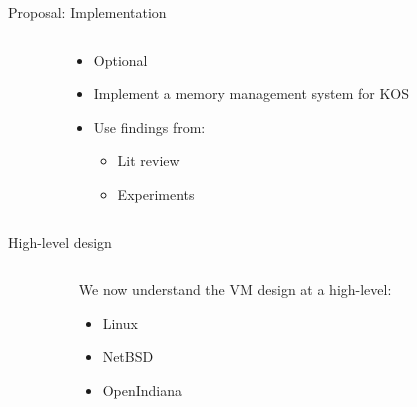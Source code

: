 \documentclass[aspectratio=169]{beamer}
\newcommand{\bi}{\begin{itemize}}
\newcommand{\ei}{\end{itemize}}
\begin{document}
\begin{frame}{Proposal: Implementation}
  \begin{columns}[T]
    \begin{column}{0.2\textwidth}
    \end{column}
    \begin{column}{0.6\textwidth}
      \bi
      \pause
    \item Optional
      \pause
    \item Implement a memory management system for KOS
      \pause
    \item Use findings from:
      \bi
      \pause
    \item Lit review
      \pause
    \item Experiments
      \ei
      \ei
    \end{column}
    \begin{column}{0.2\textwidth}
    \end{column}
  \end{columns}
\end{frame}

\begin{frame}{High-level design}
  \begin{columns}[T]
    \begin{column}{0.2\textwidth}
    \end{column}
    \begin{column}{0.6\textwidth}
      We now understand the VM design at a high-level:
      \bi
      \pause
    \item Linux
      \pause
    \item NetBSD
      \pause
    \item OpenIndiana
      \ei
    \end{column}
    \begin{column}{0.2\textwidth}
    \end{column}
  \end{columns}
\end{frame}
\end{document}

